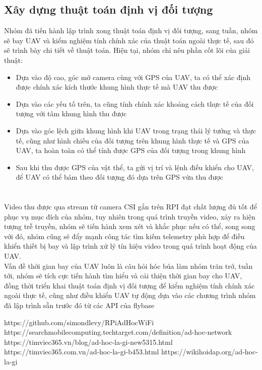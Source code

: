 \documentclass[12pt,a4paper]{report}
\begin{document}
\section{Xây dựng thuật toán định vị đối tượng}
\hspace{25pt} Nhóm đã tiến hành lập trình xong thuật toán định vị đối tượng, sang tuần, nhóm sẽ bay UAV và kiểm nghiệm tính chính xác của thuật toán ngoài thực tế, sau đó sẽ trình bày chi tiết về thuật toán. Hiện tại, nhóm chỉ nêu phần cốt lõi của giải thuật:
\begin{itemize} 
	\item Dựa vào độ cao, góc mở camera cùng với GPS của UAV, ta có thể xác định được chính xác kích thước khung hình thực tế mà UAV thu được
	\item Dựa vào các yếu tố trên, ta cũng tính chính xác khoảng cách thực tế của đối tượng với tâm khung hình thu được 
	\item Dựa vào góc lệch giữa khung hình khi UAV trong trạng thái lý tưởng và thực tế, cũng như hình chiếu của đối tượng trên khung hình thực tế và GPS của UAV, ta hoàn toàn có thể tính được GPS của đối tượng trong khung hình
	\item Sau khi thu được GPS của vật thể, ta gửi vị trí và lệnh điều khiển cho UAV, để UAV có thể bám theo đối tượng đó dựa trên GPS vừa thu được 
\end{itemize}

\chapter*{}                         %
\hspace{25pt} Video thu được qua stream từ camera CSI gắn trên RPI đạt chất lượng đủ tốt để phục vụ mục đích của nhóm, tuy nhiên trong quá trình truyền video, xảy ra hiện tượng trễ truyền, nhóm sẽ tiến hành xem xét và khắc phục nếu có thể, song song với đó, nhóm cũng sẽ đẩy mạnh công tác tìm kiếm telemetry phù hợp để điều khiển thiết bị bay và lập trình xử lý tín hiệu video trong quá trình hoạt động của UAV.\\
Vấn đề thời gian bay của UAV luôn là câu hỏi hóc búa làm nhóm trăn trở, tuần tới, nhóm sẽ tích cực tiến hành tìm hiểu và cải thiện thời gian bay cho UAV, đồng thời triển khai thuật toán định vị đối tượng để kiểm nghiệm tính chính xác ngoài thực tế, cũng như điều khiển UAV tự động dựa vào các chương trình nhóm đã lập trình sẵn trước đó từ các API của flybase

\begin{thebibliography}{99}               %

 https://github.com/simondlevy/RPiAdHocWiFi
 https://searchmobilecomputing.techtarget.com/definition/ad-hoc-network
 https://timviec365.vn/blog/ad-hoc-la-gi-new5315.html
 https://timviec365.com.vn/ad-hoc-la-gi-b453.html
 https://wikihoidap.org/ad-hoc-la-gi

\end{thebibliography}
\end{document}
